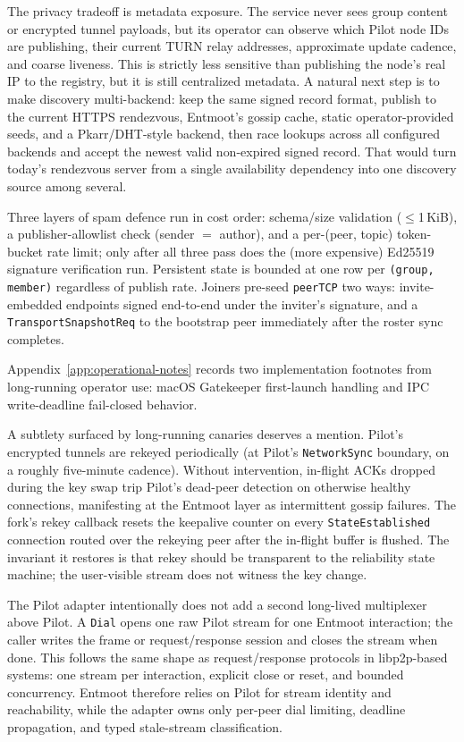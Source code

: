 \documentclass[11pt,a4paper,twocolumn]{article}
\begin{document}
The privacy tradeoff is metadata exposure. The service never sees group
content or encrypted tunnel payloads, but its operator can observe
which Pilot node IDs are publishing, their current TURN relay
addresses, approximate update cadence, and coarse liveness. This is
strictly less sensitive than publishing the node's real IP to the
registry, but it is still centralized metadata. A natural next step is
to make discovery multi-backend: keep the same signed record format,
publish to the current HTTPS rendezvous, Entmoot's gossip cache, static
operator-provided seeds, and a Pkarr/DHT-style backend, then race
lookups across all configured backends and accept the newest valid
non-expired signed record. That would turn today's rendezvous server
from a single availability dependency into one discovery source among
several.

Three layers of spam defence run in cost order: schema/size
validation ($\le$1\,KiB), a publisher-allowlist check (sender
$=$ author), and a per-(peer, topic) token-bucket rate limit;
only after all three pass does the (more expensive) Ed25519
signature verification run. Persistent state is bounded at one
row per \texttt{(group, member)} regardless of publish rate.
Joiners pre-seed \texttt{peerTCP} two ways: invite-embedded
endpoints signed end-to-end under the inviter's signature, and a
\texttt{TransportSnapshotReq} to the bootstrap peer immediately
after the roster sync completes.

Appendix~\ref{app:operational-notes} records two implementation
footnotes from long-running operator use: macOS Gatekeeper first-launch
handling and IPC write-deadline fail-closed behavior.

A subtlety surfaced by long-running canaries deserves a mention.
Pilot's encrypted tunnels are rekeyed periodically (at Pilot's
\texttt{NetworkSync} boundary, on a roughly five-minute cadence).
Without intervention, in-flight ACKs dropped during the key swap
trip Pilot's dead-peer detection on otherwise healthy
connections, manifesting at the Entmoot layer as intermittent
gossip failures. The fork's rekey callback resets the keepalive
counter on every \texttt{StateEstablished} connection routed over
the rekeying peer after the in-flight buffer is flushed. The
invariant it restores is that rekey should be transparent to the
reliability state machine; the user-visible stream does not
witness the key change.

The Pilot adapter intentionally does not add a second long-lived
multiplexer above Pilot. A \texttt{Dial} opens one raw Pilot stream for
one Entmoot interaction; the caller writes the frame or request/response
session and closes the stream when done. This follows the same shape as
request/response protocols in libp2p-based systems: one stream per
interaction, explicit close or reset, and bounded concurrency. Entmoot
therefore relies on Pilot for stream identity and reachability, while
the adapter owns only per-peer dial limiting, deadline propagation, and
typed stale-stream classification.
\end{document}
